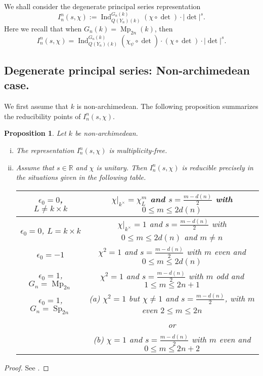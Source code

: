 \documentclass[10pt]{amsart}
\theoremstyle{plain}
\newtheorem{Prop}[equation]{Proposition}
\numberwithin{equation}{section}
\begin{document}
We shall
 consider the degenerate principal series representation
\[  I^n_n(s,\chi) := {\operatorname{Ind}}_{Q(Y_n)(k)}^{G_n(k)} (\chi \circ \det) \cdot |\det|^s. \]
 Here we recall that when $G_n(k) = {\operatorname{Mp}}_{2n}(k)$, then
 \[  I^n_n(s,\chi)  = {\operatorname{Ind}}_{Q(Y_n)(k)}^{G_n(k)} (\chi_{\psi}
 \circ \det)\cdot (\chi \circ \det)  \cdot |\det|^s. \] 
 \vskip 10pt

\subsection{\bf Degenerate principal series: Non-archimedean case.}
We first assume that $k$ is non-archimedean. The following proposition
summarizes the reducibility points of $ I^n_n(s, \chi)$.
\vskip 10pt
 
 \begin{Prop} \label{P:redu}
 Let $k$ be non-archimedean.
\begin{enumerate}[(i)]
\item The representation $I^n_n(s, \chi)$ is multiplicity-free.
\item Assume that $s \in {\mathbb{R}}$ and $\chi$ is unitary. Then
  $I^n_n(s,\chi)$ is reducible precisely in the situations given in
  the following table.
\begin{center}
{
\begin{tabular}{|c|c|}
\hline 
$\epsilon_ 0 = 0$, $L\neq k\times k$ & $\chi|_{k^{\times}} = \chi_L^m$ and $s =
\tfrac{m-d(n)}{2}$ with $0 \le m \le 2 d(n)$ \\ \hline 
$\epsilon_ 0 = 0$, $L= k\times k$ & $\chi|_{k^{\times}} = 1$ and $s =
\tfrac{m-d(n)}{2}$ with $0 \le m \le 2 d(n)$ and $m \ne n$ \\ \hline 
$\epsilon_0 = -1$ & $\chi^2 =1$ and $s = \tfrac{m-d(n)}{2} $ with $m$
even and $0 \le m \le 2d(n) $ \\ \hline 
$\epsilon_0  =1$, $G_n={\operatorname{Mp}}_{2n}$ & $\chi^2 = 1$ and $s =
\frac{m-d(n)}{2}$ with $m$ odd and $1\leq m \leq 2n+1$ \\ \hline
$\epsilon_0 =1$, $G_n = {\operatorname{Sp}}_{2n}$ & 
 (a) $\chi^2 =1$ but $\chi \ne 1$ and $s = \tfrac{m-d(n)}{2}$, with
 $m$ even  $2 \le m \le 2n$ \\ 
& or \\
 & (b) $\chi=1$  and $s = \tfrac{m-d(n)}{2} $ with   $m$ even and  $0
 \le m \le 2n+2$ \\
 \hline 
\end{tabular}
}
\end{center}
\end{enumerate}
\end{Prop}
\begin{proof}
See \cite{KR4, KS, S2, Y1}.
\end{proof}
\end{document}

